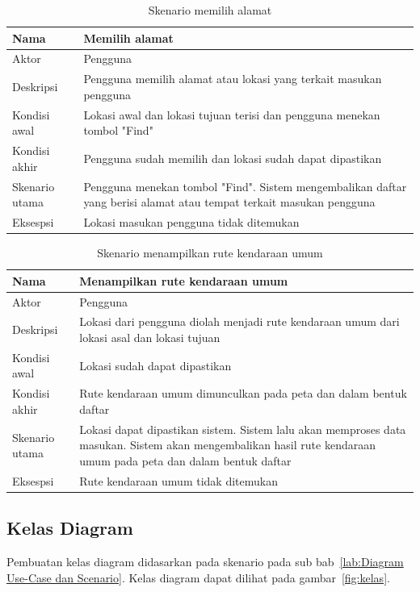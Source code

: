 \begin{table}[H]
	\centering
		\begin{tabular}{ |p{2cm}|p{10cm}| }
			\hline
			Nama &  Memilih alamat\\ \hline
			Aktor & Pengguna  \\ \hline
			Deskripsi & Pengguna memilih alamat atau lokasi yang terkait masukan pengguna \\ \hline
			Kondisi awal & Lokasi awal dan lokasi tujuan terisi dan pengguna menekan tombol "Find" \\ \hline
			Kondisi akhir & Pengguna sudah memilih dan lokasi sudah dapat dipastikan  \\ \hline
			Skenario utama & Pengguna menekan tombol "Find". Sistem mengembalikan daftar yang berisi alamat atau tempat terkait masukan pengguna \\ \hline
			Eksespsi & Lokasi masukan pengguna tidak ditemukan  \\ 
			\hline
		\end{tabular}
	\caption{Skenario memilih alamat}
	\label{tab:memilihAlamat}
\end{table}

\begin{table}[H]
	\centering
		\begin{tabular}{ |p{2cm}|p{10cm}| }
			\hline
			Nama &  Menampilkan rute kendaraan umum\\ \hline
			Aktor & Pengguna  \\ \hline
			Deskripsi & Lokasi dari pengguna diolah menjadi rute kendaraan umum dari lokasi asal dan lokasi tujuan \\ \hline
			Kondisi awal & Lokasi sudah dapat dipastikan \\ \hline
			Kondisi akhir & Rute kendaraan umum dimunculkan pada peta dan dalam bentuk daftar \\ \hline
			Skenario utama & Lokasi dapat dipastikan sistem. Sistem lalu akan memproses data masukan. Sistem akan mengembalikan hasil rute kendaraan umum pada peta dan dalam bentuk daftar \\ \hline
			Eksespsi & Rute kendaraan umum tidak ditemukan  \\ 
			\hline
		\end{tabular}
	\caption{Skenario menampilkan rute kendaraan umum}
	\label{tab:menampilkan}
\end{table}

\subsection{Kelas Diagram}
\label{lab:Kelas Diagram}
\hspace{0.5cm} Pembuatan kelas diagram didasarkan pada skenario pada sub bab~\ref{lab:Diagram Use-Case dan Scenario}. Kelas diagram dapat dilihat pada gambar~\ref{fig:kelas}.


